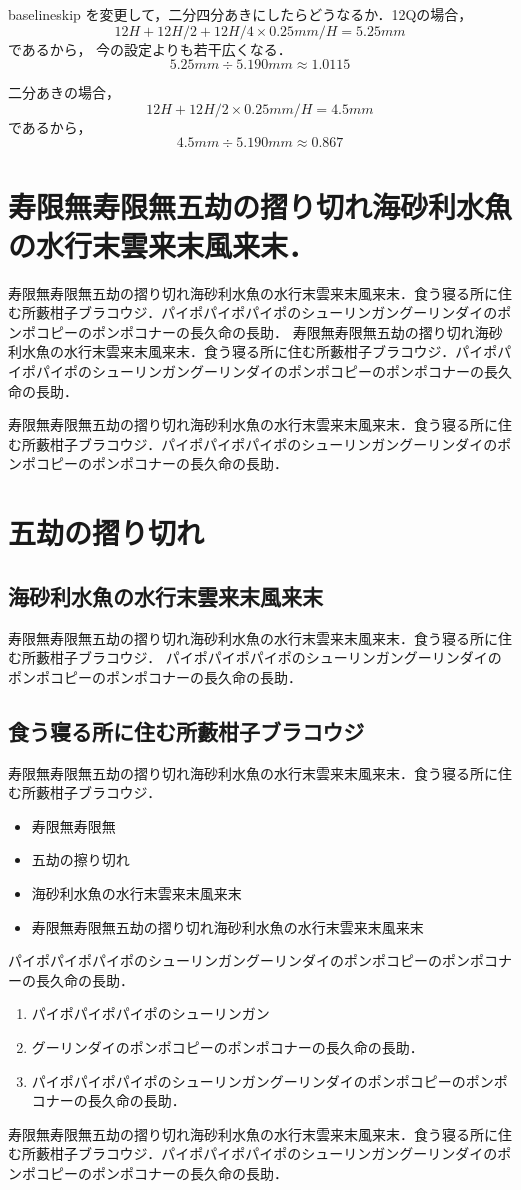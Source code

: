 \documentclass[a4j, 12Q, twocolumn, twoside]{jsarticle}
\begin{document}
  baselineskip を変更して，二分四分あきにしたらどうなるか．12Qの場合，
  \[ 12H + 12H/2 + 12H/4 \times 0.25mm/H= 5.25mm\]であるから，
  今の設定よりも若干広くなる．  
  \[5.25mm \div 5.190mm \approx 1.0115 \] 
  
  二分あきの場合，
  \[ 12H + 12H/2 \times 0.25mm/H= 4.5mm\]であるから，
  \[4.5mm \div 5.190mm \approx 0.867 \]
  
\section{寿限無寿限無五劫の摺り切れ海砂利水魚の水行末雲来末風来末．}
寿限無寿限無五劫の摺り切れ海砂利水魚の水行末雲来末風来末．食う寝る所に住む所藪柑子ブラコウジ．パイポパイポパイポのシューリンガングーリンダイのポンポコピーのポンポコナーの長久命の長助．
寿限無寿限無五劫の摺り切れ海砂利水魚の水行末雲来末風来末．食う寝る所に住む所藪柑子ブラコウジ．パイポパイポパイポのシューリンガングーリンダイのポンポコピーのポンポコナーの長久命の長助．

寿限無寿限無五劫の摺り切れ海砂利水魚の水行末雲来末風来末．食う寝る所に住む所藪柑子ブラコウジ．パイポパイポパイポのシューリンガングーリンダイのポンポコピーのポンポコナーの長久命の長助．
\section{五劫の摺り切れ}
\subsection{海砂利水魚の水行末雲来末風来末}
寿限無寿限無五劫の摺り切れ海砂利水魚の水行末雲来末風来末．食う寝る所に住む所藪柑子ブラコウジ．
パイポパイポパイポのシューリンガングーリンダイのポンポコピーのポンポコナーの長久命の長助．
\subsection{食う寝る所に住む所藪柑子ブラコウジ}
寿限無寿限無五劫の摺り切れ海砂利水魚の水行末雲来末風来末．食う寝る所に住む所藪柑子ブラコウジ．
\begin{itemize}
  \item 寿限無寿限無 
  \item 五劫の擦り切れ
  \item 海砂利水魚の水行末雲来末風来末
  \item 寿限無寿限無五劫の摺り切れ海砂利水魚の水行末雲来末風来末
\end{itemize}
%
パイポパイポパイポのシューリンガングーリンダイのポンポコピーのポンポコナーの長久命の長助．
\begin{enumerate}
  \item パイポパイポパイポのシューリンガン
  \item グーリンダイのポンポコピーのポンポコナーの長久命の長助．
  \item パイポパイポパイポのシューリンガングーリンダイのポンポコピーのポンポコナーの長久命の長助．
\end{enumerate}
%
寿限無寿限無五劫の摺り切れ海砂利水魚の水行末雲来末風来末．食う寝る所に住む所藪柑子ブラコウジ．パイポパイポパイポのシューリンガングーリンダイのポンポコピーのポンポコナーの長久命の長助．
\end{document}
